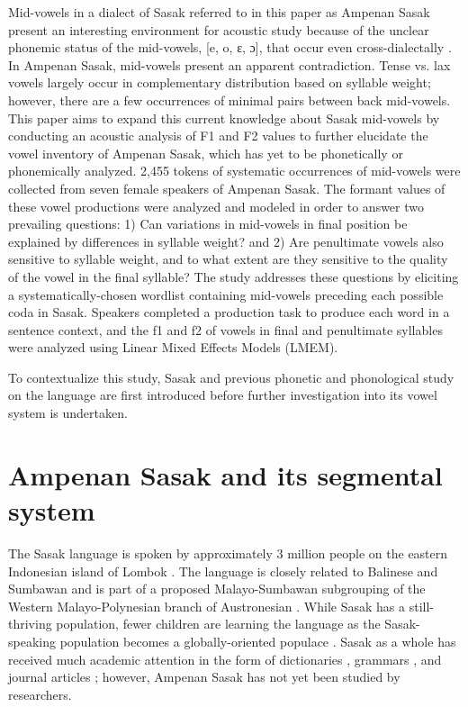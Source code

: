 \documentclass[12pt]{ouparticle}
\begin{document}
Mid-vowels in a dialect of Sasak referred to in this paper as Ampenan Sasak present an interesting environment for acoustic study because of the unclear phonemic status of the mid-vowels, [e, o, ɛ, ɔ], that occur even cross-dialectally \citep{chahal1998, jacq1998, archangeli2018}. In Ampenan Sasak, mid-vowels present an apparent contradiction. Tense vs. lax vowels largely occur in complementary distribution based on syllable weight; however, there are a few occurrences of minimal pairs between back mid-vowels. This paper aims to expand this current knowledge about Sasak mid-vowels by conducting an acoustic analysis of F1 and F2 values to further elucidate the vowel inventory of Ampenan Sasak, which has yet to be phonetically or phonemically analyzed. 2,455 tokens of systematic occurrences of mid-vowels were collected from seven female speakers of Ampenan Sasak. The formant values of these vowel productions were analyzed and modeled in order to answer two prevailing questions: 1) Can variations in mid-vowels in final position be explained by differences in syllable weight? and 2) Are penultimate vowels also sensitive to syllable weight, and to what extent are they sensitive to the quality of the vowel in the final syllable? The study addresses these questions by eliciting a systematically-chosen wordlist containing mid-vowels preceding each possible coda in Sasak. Speakers completed a production task to produce each word in a sentence context, and the f1 and f2 of vowels in final and penultimate syllables were analyzed using Linear Mixed Effects Models (LMEM).

To contextualize this study, Sasak and previous phonetic and phonological study on the language are first introduced before further investigation into its vowel system is undertaken.


\section{Ampenan Sasak and its segmental system}\label{sec:segment}

The Sasak language is spoken by approximately 3 million people on the eastern Indonesian island of Lombok \citep{eberhard2019}. The language is closely related to Balinese and Sumbawan and is part of a proposed Malayo-Sumbawan subgrouping of the Western Malayo-Polynesian branch of Austronesian \citep{adelaar2005}. While Sasak has a still-thriving population, fewer children are learning the language as the Sasak-speaking population becomes a globally-oriented populace \citep{djenar2018}. Sasak as a whole has received much academic attention in the form of dictionaries \citep{thoir1985, staff1995}, grammars \citep{thoir1985/6}, and journal articles \citep{austin2010, archangeli2017}; however, Ampenan Sasak has not yet been studied by researchers.
\end{document}

